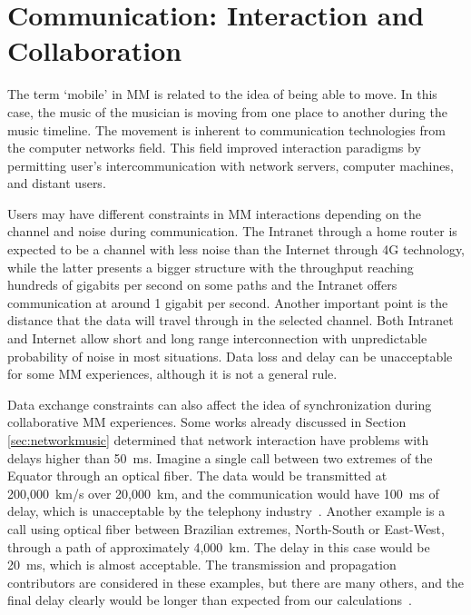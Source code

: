 \section{Communication: Interaction and Collaboration}
\label{sec:communication}

The term `mobile' in MM is related to the idea of being able to move.
In this case, the music of the musician is moving from one place to another during the music timeline.
The movement is inherent to communication technologies from the computer networks field.
This field improved interaction paradigms by permitting user's intercommunication with network servers, computer machines, and distant users.

Users may have different constraints in MM interactions depending on the channel and noise during communication.
The Intranet through a home router is expected to be a channel with less noise than the Internet through 4G technology, while the latter presents a bigger structure with the throughput reaching hundreds of gigabits per second on some paths and the Intranet offers communication at around 1 gigabit per second.
Another important point is the distance that the data will travel through in the selected channel.
Both Intranet and Internet allow short and long range interconnection with unpredictable probability of noise in most situations.
Data loss and delay can be unacceptable for some MM experiences, although it is not a general rule. 

Data exchange constraints can also affect the idea of synchronization during collaborative MM experiences.
Some works already discussed in Section \ref{sec:networkmusic} determined that network interaction have problems with delays higher than 50~ms.
Imagine a single call between two extremes of the Equator through an optical fiber.
The data would be transmitted at 200,000~km/s over 20,000~km, and the communication would have 100~ms of delay, which is unacceptable by the telephony industry~\citep{Cheshire1996latency}.
Another example is a call using optical fiber between Brazilian extremes, North-South or East-West, through a path of approximately 4,000~km.
The delay in this case would be 20~ms, which is almost acceptable.
The transmission and propagation contributors are considered in these examples, but there are many others, and the final delay clearly would be longer than expected from our calculations~\citep[p.~8831]{Rottondi2016overview}.

